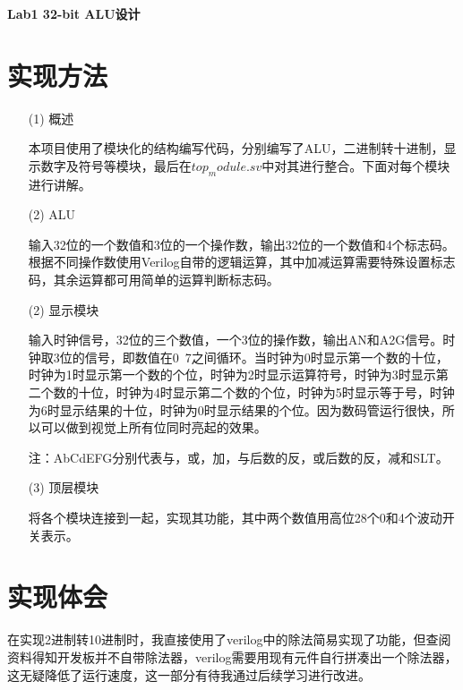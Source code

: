 \documentclass[UTF8]{article}
\begin{document}
	\begin{center}
	\textbf{{\huge Lab1 32-bit ALU设计}}
	\end{center}
	\section{实现方法}
	\begin{enumerate}
		\item [(1)] 概述
		\par 本项目使用了模块化的结构编写代码，分别编写了ALU，二进制转十进制，显示数字及符号等模块，最后在$top_module.sv$中对其进行整合。下面对每个模块进行讲解。
		\item [(2)] ALU
		\par 
		输入32位的一个数值和3位的一个操作数，输出32位的一个数值和4个标志码。根据不同操作数使用Verilog自带的逻辑运算，其中加减运算需要特殊设置标志码，其余运算都可用简单的运算判断标志码。
		\item [(2)] 显示模块
		\par 
		输入时钟信号，32位的三个数值，一个3位的操作数，输出AN和A2G信号。时钟取3位的信号，即数值在0~7之间循环。当时钟为0时显示第一个数的十位，时钟为1时显示第一个数的个位，时钟为2时显示运算符号，时钟为3时显示第二个数的十位，时钟为4时显示第二个数的个位，时钟为5时显示等于号，时钟为6时显示结果的十位，时钟为0时显示结果的个位。因为数码管运行很快，所以可以做到视觉上所有位同时亮起的效果。
		
		注：AbCdEFG分别代表与，或，加，与后数的反，或后数的反，减和SLT。
		\item [(3)] 顶层模块
		\par 
		将各个模块连接到一起，实现其功能，其中两个数值用高位28个0和4个波动开关表示。
	\end{enumerate}
	\section{实现体会}
	\par 在实现2进制转10进制时，我直接使用了verilog中的除法简易实现了功能，但查阅资料得知开发板并不自带除法器，verilog需要用现有元件自行拼凑出一个除法器，这无疑降低了运行速度，这一部分有待我通过后续学习进行改进。
\end{document}
